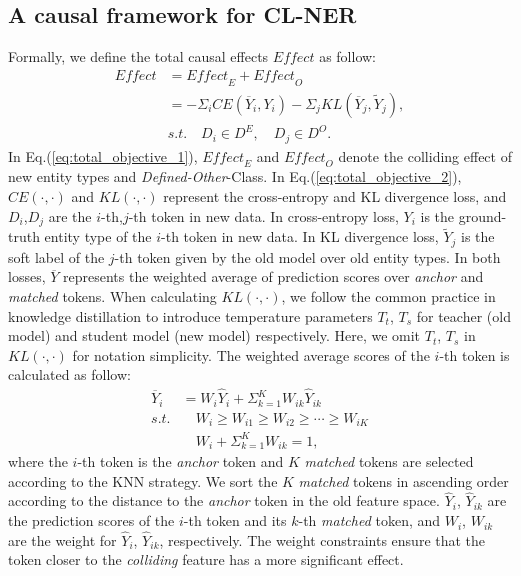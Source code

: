 \documentclass[11pt]{article}
\begin{document}
\subsection{A causal framework for CL-NER}
Formally, we define the total causal effects $\textit{Effect}$ as follow:
\begin{align}
 \textit{Effect} &= \textit{Effect}_{E} + \textit{Effect}_{O} \label{eq:total_objective_1} \\
  &= - \Sigma_i \textit{CE}(\overline{Y}_i, Y_i) - \Sigma_j \textit{KL}(\overline{Y}_j,\widetilde{Y}_j), \label{eq:total_objective_2}\\
  \nonumber&\textit{s.t.}\quad D_i \in D^E,\quad D_j \in D^O. 
\end{align}
In Eq.(\ref{eq:total_objective_1}), $\textit{Effect}_{E}$ and $\textit{Effect}_{O}$ denote the colliding effect of new entity types and \textit{Defined-Other}-Class. 
In Eq.(\ref{eq:total_objective_2}), $\textit{CE}(\cdot,\cdot)$ and $\textit{KL}(\cdot,\cdot)$ represent the cross-entropy and KL divergence loss, and $D_i$,$D_j$ are the $i$-th,$j$-th token in new data.
In cross-entropy loss, $Y_i$ is the ground-truth entity type of the $i$-th token in new data.
In KL divergence loss, $\widetilde{Y}_j$ is the soft label of the $j$-th token given by the old model over old entity types.
In both losses, $\overline{Y}$ represents the weighted average of prediction scores over \textit{anchor} and \textit{matched} tokens.
When calculating $\textit{KL}(\cdot,\cdot)$, we follow the common practice in knowledge distillation to introduce temperature parameters $T_t$, $T_s$  for teacher (old model) and student model (new model) respectively.
Here, we omit $T_t$, $T_s$ in $\textit{KL}(\cdot,\cdot)$ for notation simplicity.
The weighted average scores of the $i$-th token is calculated as follow:
\begin{align}
    \overline{Y}_i &= W_i \hat{Y}_i + \Sigma_{k=1}^K W_{ik} \hat{Y}_{ik} \\
    \nonumber \textit{s.t.}& \quad W_i \ge W_{i1} \ge W_{i2} \ge \cdots \ge W_{iK} \\
    \nonumber    &\quad W_i + \Sigma_{k=1}^K W_{ik} = 1,
\end{align}
where the $i$-th token is the \textit{anchor} token and $K$ \textit{matched} tokens are selected according to the KNN strategy.
We sort the $K$ \textit{matched} tokens in ascending order according to the distance to the \textit{anchor} token in the old feature space.
$\hat{Y}_i$, $\hat{Y}_{ik}$ are the prediction scores of the $i$-th token and its $k$-th \textit{matched} token, and $W_i$, $W_{ik}$ are the weight for $\hat{Y}_i$, $\hat{Y}_{ik}$, respectively.
The weight constraints ensure that the token closer to the \textit{colliding} feature has a more significant effect.
\end{document}
